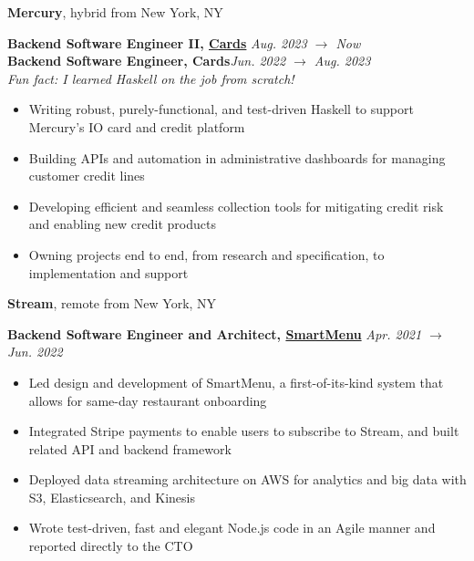 \documentclass[10pt]{article}
\begin{document}
\begin{flushleft}
		\textbf{Mercury}, {\small hybrid from New York, NY}\\
		\begin{leftli}
			{\small \textbf{Backend Software Engineer II, \href{https://mercury.com/credit}{Cards}} \hfill \textit{\small Aug. 2023 $\rightarrow$ Now}}\\
			{\small \textbf{Backend Software Engineer, Cards}\hfill \textit{\small Jun. 2022 $\rightarrow$ Aug. 2023}}\\
			{\footnotesize \textit{Fun fact: I learned Haskell on the job from scratch!}}
			\begin{itemize}
				\item Writing robust, purely-functional, and test-driven Haskell to support Mercury's IO card and credit platform
				\vspace{-2mm}
				\item Building APIs and automation in administrative dashboards for managing customer credit lines
				\vspace{-2mm}
				\item Developing efficient and seamless collection tools for mitigating credit risk and enabling new credit products
				\vspace{-2mm}
				\item Owning projects end to end, from research and specification, to implementation and support
			\end{itemize}
		\end{leftli}

		\vspace{-1.50mm}
		\textbf{Stream}, {\small remote from New York, NY}\\
		\begin{leftli}
			{\small \textbf{Backend Software Engineer and Architect, \href{https://www.streamorders.com/product-features/full-control}{SmartMenu}} \hfill \textit{\small Apr. 2021 $\rightarrow$ Jun. 2022}}\\
			\begin{itemize}
				\item Led design and development of SmartMenu, a first-of-its-kind system that allows for same-day restaurant onboarding
				\vspace{-2mm}
				\item Integrated Stripe payments to enable users to subscribe to Stream, and built related API and backend framework
				\vspace{-2mm}
				\item Deployed data streaming architecture on AWS for analytics and big data with S3, Elasticsearch, and Kinesis
				\vspace{-2mm}
				\item Wrote test-driven, fast and elegant Node.js code in an Agile manner and reported directly to the CTO
			\end{itemize}
		\end{leftli}


\end{flushleft}
\end{document}
